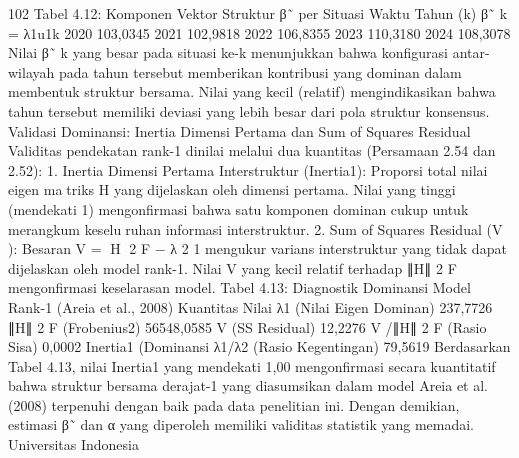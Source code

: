 102
Tabel 4.12: Komponen Vektor Struktur β˜ per Situasi Waktu
Tahun (k) β˜
k = λ1u1k
2020 103,0345
2021 102,9818
2022 106,8355
2023 110,3180
2024 108,3078
Nilai β˜
k yang besar pada situasi ke-k menunjukkan bahwa konfigurasi antar-wilayah
pada tahun tersebut memberikan kontribusi yang dominan dalam membentuk struktur
bersama. Nilai yang kecil (relatif) mengindikasikan bahwa tahun tersebut memiliki deviasi
yang lebih besar dari pola struktur konsensus.
Validasi Dominansi: Inertia Dimensi Pertama dan Sum of Squares Residual
Validitas pendekatan rank-1 dinilai melalui dua kuantitas (Persamaan 2.54 dan 2.52):
1. Inertia Dimensi Pertama Interstruktur (Inertia1): Proporsi total nilai eigen matriks H yang dijelaskan oleh dimensi pertama. Nilai yang tinggi (mendekati 1)
mengonfirmasi bahwa satu komponen dominan cukup untuk merangkum keseluruhan informasi interstruktur.
2. Sum of Squares Residual (V ): Besaran V = ∥H∥
2
F − λ
2
1 mengukur varians
interstruktur yang tidak dapat dijelaskan oleh model rank-1. Nilai V yang kecil
relatif terhadap ∥H∥
2
F mengonfirmasi keselarasan model.
Tabel 4.13: Diagnostik Dominansi Model Rank-1 (Areia et al., 2008)
Kuantitas Nilai
λ1 (Nilai Eigen Dominan) 237,7726
∥H∥
2
F
(Frobenius2) 56548,0585
V (SS Residual) 12,2276
V /∥H∥
2
F
(Rasio Sisa) 0,0002
Inertia1 (Dominansi %
λ1/λ2 (Rasio Kegentingan) 79,5619
Berdasarkan Tabel 4.13, nilai Inertia1 yang mendekati 1,00 mengonfirmasi secara
kuantitatif bahwa struktur bersama derajat-1 yang diasumsikan dalam model Areia et al.
(2008) terpenuhi dengan baik pada data penelitian ini. Dengan demikian, estimasi β˜ dan
α yang diperoleh memiliki validitas statistik yang memadai.
Universitas Indonesia

